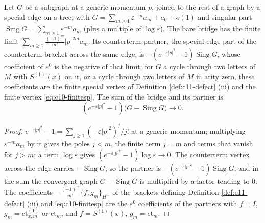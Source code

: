 \begin{lemma}
\label{lem:c12-bridge}
Let $G$ be a subgraph at a generic momentum $p$, joined to the rest of a graph by a special edge on a tree, with $G=\sum_{m\ge1}\varepsilon^{-m}a_m+a_0+o(1)$ and singular part $\operatorname{Sing}G=\sum_{m\ge1}\varepsilon^{-m}a_m$ (plus a multiple of $\log\varepsilon$). The bare bridge has the finite limit $\sum_{m\ge1}\frac{(-1)^m}{m!}|p|^{2m}a_m$. Its counterterm partner, the special-edge part of the counterterm bracket across the same edge, is $-(e^{-\varepsilon|p|^2}-1)\operatorname{Sing}G$, whose coefficient of $\varepsilon^0$ is the negative of that limit; for $G$ a cycle through two letters of $M$ with $S^{(1)}(x)$ on it, or a cycle through two letters of $M$ in arity zero, these coefficients are the finite special vertex of Definition \ref{def:c11-defect} (iii) and the finite vertex \eqref{eq:c10-finitesp}. The sum of the bridge and its partner is
\begin{equation}
(e^{-\varepsilon|p|^2}-1)\big(G-\operatorname{Sing}G\big)\longrightarrow0 .
\label{eq:c12-bridge}
\end{equation}
\end{lemma}

\begin{proof}
$e^{-\varepsilon|p|^2}-1=\sum_{j\ge1}(-\varepsilon|p|^2)^j/j!$ at a generic momentum; multiplying $\varepsilon^{-m}a_m$ by it gives the poles $j<m$, the finite term $j=m$ and terms that vanish for $j>m$; a term $\log\varepsilon$ gives $(e^{-\varepsilon|p|^2}-1)\log\varepsilon\to0$. The counterterm vertex across the edge carries $-\operatorname{Sing}G$, so the partner is $-(e^{-\varepsilon|p|^2}-1)\operatorname{Sing}G$, and in the sum the convergent graph $G-\operatorname{Sing}G$ is multiplied by a factor tending to $0$. The coefficients $-\frac{(-1)^m}{m!}\{f,g_m\}_{H^m}$ of the brackets defining Definition \ref{def:c11-defect} (iii) and \eqref{eq:c10-finitesp} are the $\varepsilon^0$ coefficients of the partners with $f=I$, $g_m=\mathrm{ct}^{(1)}_{x,m}$ or $\mathrm{ct}_m$, and $f=S^{(1)}(x)$, $g_m=\mathrm{ct}_m$.
\end{proof}

